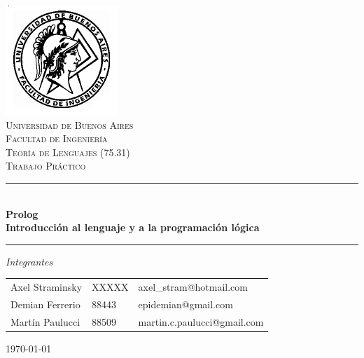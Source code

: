 \documentclass{article}
\begin{document}
\begin{titlepage}

\thispagestyle{empty}

\begin{center}
\includegraphics[scale=0.55]{./fiuba}\\
\textsc{\Large Universidad de Buenos Aires}\\[0.2cm]
\textsc{\Large Facultad de Ingeniería}\\[1.5cm]


\textsc{\large Teoría de Lenguajes (75.31)} \\[0.3cm]
\textsc{\large Trabajo Práctico} \\[0.5cm]

\rule{\linewidth}{0.5mm} \\[0.4cm]
{\huge \bfseries Prolog} \\[0.3cm]
{\Large \bfseries Introducción al lenguaje y a la programación lógica}
\rule{\linewidth}{0.5mm} 

\vfill

\begin{flushleft}
\Large\emph{Integrantes} \\[0.2cm]


\begin{tabular}{lll}
Axel Straminsky & XXXXX & axel\_stram@hotmail.com \\
Demian Ferrerio & 88443 & epidemian@gmail.com \\
Martín Paulucci & 88509 & martin.c.paulucci@gmail.com \\
\end{tabular}
\end{flushleft}

{\Large \today}

\end{center}
\end{titlepage}

\end{document}
